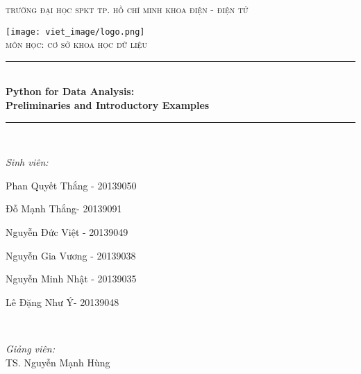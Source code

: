 \begin{titlepage}
\newcommand{\HRule}{\rule{\linewidth}{0.5mm}} 


\begin{center}

\quad \quad \quad \quad \quad \textsc{\LARGE trường đại học spkt tp. hồ chí minh}
\newline
\textsc{\LARGE khoa điện - điện tử}\\[1.5cm] 


\graphicspath{ {./logo/} }
 
\texttt{[image: viet\_image/logo.png]}\\[2.5 cm]


\textsc{\huge môn học: cơ sở khoa học dữ liệu}\\[1.0cm] 


\HRule \\[0.4cm]
{\large \bfseries Python for Data Analysis:}\\[0.4cm]
{ \huge \bfseries Preliminaries and Introductory Examples}\\[0.4cm] 

\HRule \\[2.5cm]


\begin{minipage}{0.5\textwidth}
\begin{flushleft} 
\emph{Sinh viên:}\\

\end{flushleft}
Phan Quyết Thắng - 20139050\par
Đỗ Mạnh Thắng\quad\enskip- 20139091\par
Nguyễn Đức Việt\enskip\;  - 20139049\par
Nguyễn Gia Vương - 20139038\par
Nguyễn Minh Nhật - 20139035\par
Lê Đặng Như Ý\quad\enskip\:- 20139048\par 
\end{minipage}
~
\begin{minipage}{0.4\textwidth}
\begin{flushright} 
\emph{Giảng viên:} \\
TS. Nguyễn Mạnh Hùng %
\end{flushright}
\end{minipage}\\[2cm]



\end{center}
\end{titlepage}
